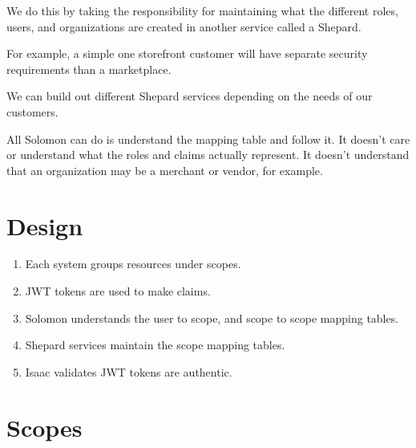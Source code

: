 \documentclass[11pt]{article}
\begin{document}
We do this by taking the responsibility for maintaining what the different roles,
users, and organizations are created in another service called a Shepard.

For example, a simple one storefront customer will have separate security requirements
than a marketplace. 

We can build out different Shepard services depending on the needs of our customers.

All Solomon can do is understand the mapping table and follow it. It doesn't care
or understand what the roles and claims actually represent. 
It doesn't understand that an organization may be a merchant or vendor, for
example.

\section{Design}
 
\begin{enumerate}
    \item Each system groups resources under scopes.
    \item JWT tokens are used to make claims.
    \item Solomon understands the user to scope, and scope to scope mapping tables.
    \item Shepard services maintain the scope mapping tables.
    \item Isaac validates JWT tokens are authentic.
\end{enumerate}


\section{Scopes}
\end{document}
